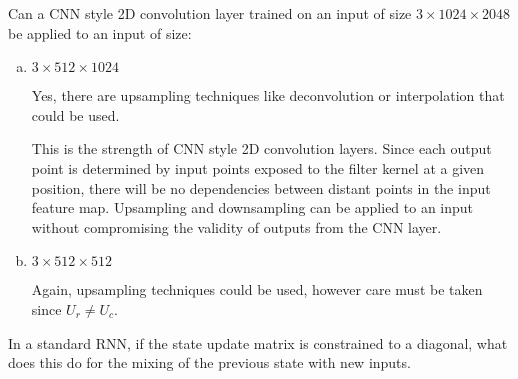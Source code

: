 \documentclass[11pt]{article}
\begin{document}
Can a CNN style 2D convolution layer trained on an input of size
$3 \times 1024 \times 2048$ be applied to an input of size:

\begin{enumerate}[(a)]\itemsep0pt
	\item $3 \times 512 \times1024$
		\begin{solution}
			Yes, there are upsampling techniques like deconvolution or
			interpolation that could be used.

			This is the strength of CNN style 2D convolution layers. Since each
			output point is determined by input points exposed to the filter
			kernel at a given position, there will be no dependencies between
			distant points in the input feature map. Upsampling and
			downsampling can be applied to an input without compromising the
			validity of outputs from the CNN layer.
		\end{solution}
	\item $3\times 512 \times512$
		\begin{solution}
			Again, upsampling techniques could be used, however care must be
			taken since $U_r \neq U_c$.
		\end{solution}
\end{enumerate}

In a standard RNN, if the state update matrix is constrained to a diagonal,
what does this do for the mixing of the previous state with new inputs.
\end{document}
